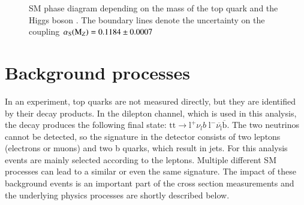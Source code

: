 \begin{figure}[htbp!]
  \begin{center}
\caption{SM phase diagram depending on the mass of the top quark and the Higgs boson \cite{Buttazzo:2013uya}. The boundary lines denote the uncertainty on the coupling $\alpha_\mathrm{S}(\mathrm{M}_Z)=0.1184\pm0.0007$
  \label{fig:theo_stability}}
  \end{center}
\end{figure}

\section{Background processes}
\label{sec:theo_back}

In an experiment, top quarks are not measured directly, but they are identified by their decay products. In the dilepton channel, which is used in this analysis, the \ttbar decay produces the following final state:
$\mathrm{tt} \rightarrow \mathrm{l}^+ \nu_l b \; \mathrm{l}^- \overline{\nu_\mathrm{l}}\overline{\mathrm{b}}$.
The two neutrinos cannot be detected, so the signature in the detector consists of two leptons (electrons or muons) and two b quarks, which result in jets.
For this analysis events are mainly selected according to the leptons.
Multiple different SM processes can lead to a similar or even the same signature. The impact of these background events is an important part of the \ttbar cross section measurements and the underlying physics processes are shortly described below.

